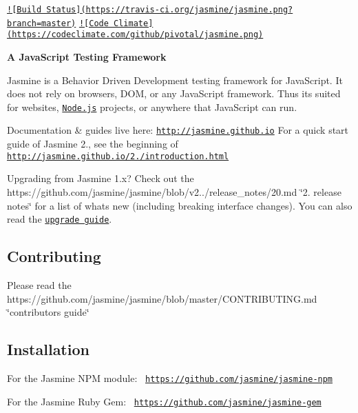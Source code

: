 \label{_README}%
\href{http://jasmine.github.io}{\tt }

\href{https://travis-ci.org/jasmine/jasmine}{\tt !\mbox{[}Build Status\mbox{]}(https\+://travis-\/ci.\+org/jasmine/jasmine.\+png?branch=master)} \href{https://codeclimate.com/github/pivotal/jasmine}{\tt !\mbox{[}Code Climate\mbox{]}(https\+://codeclimate.\+com/github/pivotal/jasmine.\+png)} 



{\bfseries A Java\+Script Testing Framework}

Jasmine is a Behavior Driven Development testing framework for Java\+Script. It does not rely on browsers, D\+O\+M, or any Java\+Script framework. Thus it\textquotesingle{}s suited for websites, \href{http://nodejs.org}{\tt Node.\+js} projects, or anywhere that Java\+Script can run.

Documentation \& guides live here\+: \href{http://jasmine.github.io/}{\tt http\+://jasmine.\+github.\+io} For a quick start guide of Jasmine 2., see the beginning of \href{http://jasmine.github.io/2.0/introduction.html}{\tt http\+://jasmine.\+github.\+io/2./introduction.\+html}

Upgrading from Jasmine 1.\+x? Check out the https\+://github.com/jasmine/jasmine/blob/v2../release\+\_\+notes/20.md \char`\"{}2. release notes\char`\"{} for a list of what\textquotesingle{}s new (including breaking interface changes). You can also read the \href{http://jasmine.github.io/2.0/upgrading.html}{\tt upgrade guide}.

\subsection*{Contributing}

Please read the https\+://github.com/jasmine/jasmine/blob/master/\+C\+O\+N\+T\+R\+I\+B\+U\+T\+I\+N\+G.\+md \char`\"{}contributors\textquotesingle{} guide\char`\"{}

\subsection*{Installation}

For the Jasmine N\+P\+M module\+:~\newline
 \href{https://github.com/jasmine/jasmine-npm}{\tt https\+://github.\+com/jasmine/jasmine-\/npm}

For the Jasmine Ruby Gem\+:~\newline
 \href{https://github.com/jasmine/jasmine-gem}{\tt https\+://github.\+com/jasmine/jasmine-\/gem}

